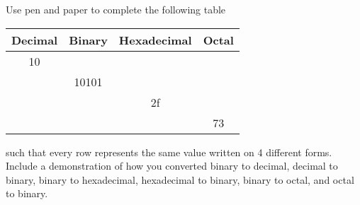 Use pen and paper to complete the following table
\begin{center}
  \begin{tabular}{|c|c|c|c|}
    \hline
    Decimal & Binary & Hexadecimal & Octal\\
    \hline
    10 &  &  & \\
    \hline
    & 10101 &  & \\
    \hline
    &  & 2f  & \\
    \hline
    &  &  & 73 \\
    \hline
  \end{tabular}
\end{center}
such that every row represents the same value written on 4 different forms. Include a demonstration of how you converted binary to decimal, decimal to binary, binary to hexadecimal, hexadecimal to binary, binary to octal, and octal to binary.

